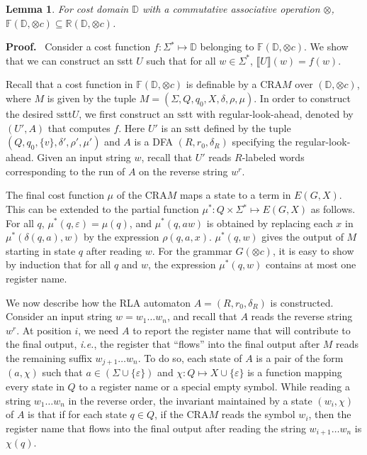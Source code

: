\documentclass[11pt]{article}
\newtheorem{lemma}[theorem]{Lemma}
\def\Proof{{\bf Proof.}}
\newcommand{\st}{\ensuremath{^*}}
\newcommand{\domain}{\ensuremath{\mathbb{D}}}
\newcommand{\CG}{G}
\newcommand{\CF}{{\mathbb F}}
\newcommand{\reg}[1]{{\mathbb R}(#1)}
\newcommand{\SSTT}{{\sc\textsc sstt}\xspace}
\newcommand{\stt}{\ensuremath{U}}
\newcommand{\inputalph}{\ensuremath{\Sigma}}
\newcommand{\fm}[1]{\ensuremath{#1^{*}}}
\newcommand{\interp}[1]{\ensuremath{\llbracket #1\rrbracket}}
\newcommand{\EDWA}{{CRA}\xspace}
\newcommand{\edwa}{\ensuremath{M}}
\newcommand{\edwastates}{\ensuremath{Q}}
\newcommand{\edwastate}{\ensuremath{q}}
\newcommand{\edwainitst}{\ensuremath{\edwastate_0}}
\newcommand{\edwavariables}{\ensuremath{X}}
\newcommand{\edwatrans}{\ensuremath{\delta}}
\newcommand{\edwavarup}{\ensuremath{\rho}}
\newcommand{\edwafinal}{\ensuremath{\mu}}
\newcommand{\setof}[1]{\{#1\}}
\newcommand{\ie}{{\em i.e.}\xspace}
\def\myplus{\otimes}
\begin{document}
\begin{lemma}
\label{mvcmrtosst}
For cost domain $\domain$ with a commutative associative operation $\myplus$,
$\CF(\domain,\myplus c)\subseteq \reg{\domain,\myplus c}$.
\end{lemma}
\Proof~ Consider a cost function $f:\Sigma\st\mapsto\domain$ belonging
to $\CF(\domain,\myplus c)$.  We show that we can construct an \SSTT
$U$ such that for all $w \in \fm\Sigma$, $\interp{U}(w) = f(w)$.

Recall that a cost function in $\CF(\domain,\myplus c)$ is definable
by a \EDWA $\edwa$ over $(\domain,\myplus c)$, where $\edwa$ is given
by the tuple
$\edwa=(\inputalph,\edwastates,\edwainitst,\edwavariables,\edwatrans,\edwavarup,\edwafinal)$.
In order to construct the desired \SSTT $\stt$, we first construct an
\SSTT with regular-look-ahead, denoted by $(\stt',A)$ that computes
$f$.  Here $\stt'$ is an \SSTT defined by the tuple
$(Q,q_0,\{v\},\delta',\rho',\mu')$ and $A$ is a DFA $(R,r_0,\delta_R)$
specifying the regular-look-ahead. Given an input string $w$, recall
that $\stt'$ reads $R$-labeled words corresponding to the run of $A$
on the reverse string $w^r$.

The final cost function $\edwafinal$ of the \EDWA $\edwa$ maps a state
to a term in $E(\CG,X)$. This can be extended to the partial function
$\edwafinal\st: Q \times \Sigma\st \mapsto E(\CG,X)$ as follows. For
all $q$, $\edwafinal\st(q,\varepsilon) = \edwafinal(q)$, and
$\edwafinal\st(q,aw)$ is obtained by replacing each $x$ in
$\edwafinal\st(\delta(q,a),w)$ by the expression $\edwavarup(q,a,x)$.
$\edwafinal\st(q,w)$ gives the output of $\edwa$ starting in state $q$
after reading $w$. For the grammar $\CG(\myplus c)$, it is easy to
show by induction that for all $q$ and $w$, the expression
$\edwafinal\st(q,w)$ contains at most one register name.

We now describe how the RLA automaton $A=(R,r_0,\delta_R)$ is
constructed.  Consider an input string $w=w_1\ldots w_n$, and recall
that $A$ reads the reverse string $w^r$.  At position $i$, we need $A$
to report the register name that will contribute to the final output,
\ie, the register that ``flows'' into the final output after $\edwa$
reads the remaining suffix $w_{j+1}\ldots w_n$. To do so, each state
of $A$ is a pair  of the form $(a,\chi)$ such that
$a\in(\Sigma\cup\setof{\varepsilon})$ and
$\chi:\edwastates\mapsto\edwavariables\cup\{\varepsilon\}$ is a
function mapping every state in $\edwastates$ to a register name or a
special empty symbol.  While reading a string $w_1\ldots w_n$ in the
reverse order, the invariant maintained by a state $(w_i,\chi)$ of $A$
is that if for each state $q \in \edwastates$, if the \EDWA $\edwa$
reads the symbol $w_i$, then the register name that flows into the
final output after reading the string $w_{i+1}\ldots w_n$ is
$\chi(q)$.
\end{document}
